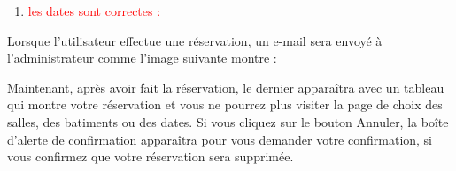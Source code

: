 \documentclass{article}
\begin{document}
\begin{enumerate}
\begin{enumerate}
          
          
          
          
               
  \item \textcolor{red}{les dates sont correctes :} 
  \vspace{0.3cm}
               \hspace*{-0.7in}

               \noindent{}
  
\end{enumerate}  

Lorsque l'utilisateur effectue une réservation, un e-mail sera envoyé à l'administrateur comme l'image suivante montre :

\vspace{0.7cm}
               \hspace*{-0.7in}

               \noindent{}  
  
  
  
	Maintenant, après avoir fait la réservation, le dernier apparaîtra avec un tableau qui montre votre réservation et vous ne pourrez plus visiter la page de choix des salles, des batiments ou des dates. Si vous cliquez sur le bouton Annuler, la boîte d'alerte de confirmation apparaîtra pour vous demander votre confirmation, si vous confirmez que votre réservation sera supprimée.
  

\end{enumerate}
\end{document}
